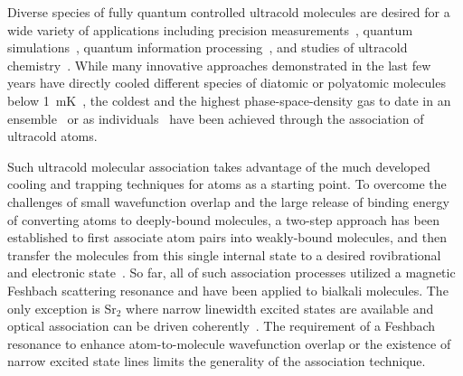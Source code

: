 \documentclass[aps,prl,twocolumn,groupedaddress]{revtex4-1}
\begin{document}

Diverse species of fully quantum controlled  ultracold molecules are desired for a  wide variety of applications including precision measurements~\cite{Nick_and_Ivan2017}, quantum simulations~\cite{Yao2018}, quantum  information processing~\cite{DeMille2002, Ni2018}, and studies of ultracold chemistry~\cite{Bohn2017,Bala2016,Hu1111}.
While many innovative approaches demonstrated in the last few years have directly cooled different species of diatomic or polyatomic molecules below 1~mK~\cite{Norrgard2016, Mitra1366}, the coldest and the highest phase-space-density gas to date in an ensemble~\cite{Demarco2018} or as individuals~\cite{Zhang2020}  have been achieved through the association of ultracold atoms.

Such ultracold molecular association takes advantage of the much developed cooling and trapping techniques for atoms as a starting point. To overcome the challenges of small wavefunction overlap and the large release of binding energy of converting atoms to deeply-bound molecules, a  two-step approach has been established to first associate atom pairs into weakly-bound molecules, and then transfer the molecules from this single internal state to a desired rovibrational and electronic state~\cite{Danzl2008, Ni2008,Lang2008, Takekoshi2014, Molony2014, Park2015, Guo2016, Kondov2019, Voges2020}.
So far, all of such association processes utilized a magnetic Feshbach scattering resonance and have been applied to bialkali molecules. The only exception is Sr$_2$ where narrow linewidth excited states are available and optical association can be driven coherently~\cite{Reinaudi2012,Stellmer2012}. The requirement of a Feshbach resonance to enhance atom-to-molecule wavefunction overlap or the existence of narrow excited state lines limits the generality of the association technique. %
\end{document}
